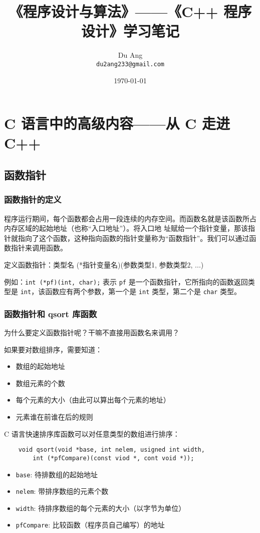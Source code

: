 \documentclass[UTF8]{ctexart}
\title{\heiti 《程序设计与算法》——《C++ 程序设计》学习笔记}
\author{\kaishu Du Ang \\ \texttt{du2ang233@gmail.com} }
\date{\today}
\begin{document}
\maketitle

\tableofcontents
\newpage

\section{C 语言中的高级内容——从 C 走进 C++}
\subsection{函数指针}
\subsubsection{函数指针的定义}
程序运行期间，每个函数都会占用一段连续的内存空间。而函数名就是该函数所占内存区域的起始地址（也称“入口地址”）。将入口地
址赋给一个指针变量，那该指针就指向了这个函数，这种指向函数的指针变量称为“函数指针”。我们可以通过函数指针来调用函数。

定义函数指针：类型名 (*指针变量名)(参数类型1, 参数类型2, ...)

例如：\texttt{int (*pf)(int, char);} 表示 \texttt{pf} 是一个函数指针，它所指向的函数返回类型是
\texttt{int}，该函数应有两个参数，第一个是 \texttt{int} 类型，第二个是 \texttt{char} 类型。

\subsubsection{函数指针和 qsort 库函数}
为什么要定义函数指针呢？干嘛不直接用函数名来调用？

如果要对数组排序，需要知道：
\begin{itemize}
    \item 数组的起始地址
    \item 数组元素的个数
    \item 每个元素的大小（由此可以算出每个元素的地址）
    \item 元素谁在前谁在后的规则
\end{itemize}

C 语言快速排序库函数可以对任意类型的数组进行排序：
\begin{verbatim}
    void qsort(void *base, int nelem, usigned int width,
        int (*pfCompare)(const viod *, cont void *));
\end{verbatim}

\begin{itemize}
    \item \texttt{base}: 待排数组的起始地址
    \item \texttt{nelem}: 带排序数组的元素个数
    \item \texttt{width}: 待排序数组的每个元素的大小（以字节为单位）
    \item \texttt{pfCompare}: 比较函数（程序员自己编写）的地址
\end{itemize}
\end{document}
